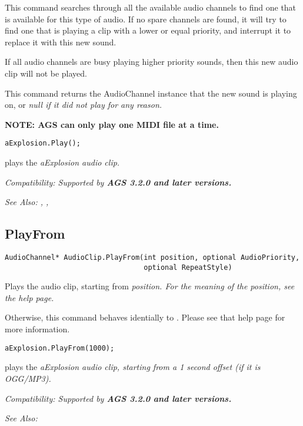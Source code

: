 This command searches through all the available audio channels to find one that is
available for this type of audio. If no spare channels are found, it will try to find
one that is playing a clip with a lower or equal priority, and interrupt it to replace
it with this new sound.

If all audio channels are busy playing higher priority sounds, then this new audio clip
will not be played.

This command returns the AudioChannel instance that the new sound is playing on, or
\it{null} if it did not play for any reason.

\bf{NOTE:} AGS can only play one MIDI file at a time.

\begin{verbatim}
aExplosion.Play();
\end{verbatim}
plays the \it{aExplosion} audio clip.

\it{Compatibility:} Supported by \bf{AGS 3.2.0} and later versions.

\it{See Also:} ,
,


\subsection{PlayFrom}\label{AudioClip.PlayFrom}%

\begin{verbatim}
AudioChannel* AudioClip.PlayFrom(int position, optional AudioPriority,
                                 optional RepeatStyle)
\end{verbatim}
Plays the audio clip, starting from \it{position}. For the meaning of the position,
see the  help page.

Otherwise, this command behaves identially to .
Please see that help page for more information.

\begin{verbatim}
aExplosion.PlayFrom(1000);
\end{verbatim}
plays the \it{aExplosion} audio clip, starting from a 1 second offset (if it is OGG/MP3).

\it{Compatibility:} Supported by \bf{AGS 3.2.0} and later versions.

\it{See Also:} 


